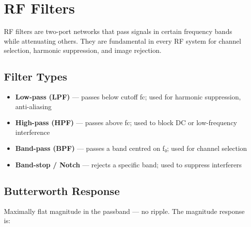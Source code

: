 \section{RF Filters}\label{sec:wiki_filters}



RF filters are two-port networks that pass signals in certain frequency bands while attenuating others. They are fundamental in every RF system for channel selection, harmonic suppression, and image rejection.

				

\subsection{Filter Types}

				
\begin{itemize}

					\item \textbf{Low-pass (LPF)} — passes below cutoff fc; used for harmonic suppression, anti-aliasing

					\item \textbf{High-pass (HPF)} — passes above fc; used to block DC or low-frequency interference

					\item \textbf{Band-pass (BPF)} — passes a band centred on f₀; used for channel selection

					\item \textbf{Band-stop / Notch} — rejects a specific band; used to suppress interferers

				
\end{itemize}

				

\subsection{Butterworth Response}

				


				

Maximally flat magnitude in the passband — no ripple. The magnitude response is:


